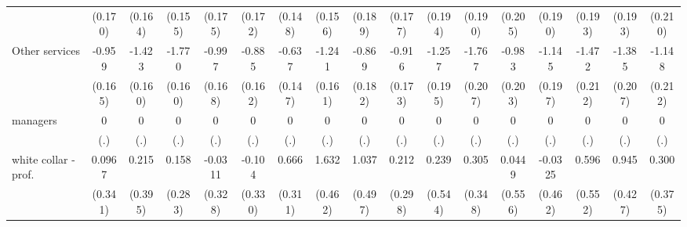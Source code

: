 {\begin{tabular}{l*{16}{c}}
                    &     (0.170)         &     (0.164)         &     (0.155)         &     (0.175)         &     (0.172)         &     (0.148)         &     (0.156)         &     (0.189)         &     (0.177)         &     (0.194)         &     (0.190)         &     (0.205)         &     (0.190)         &     (0.193)         &     (0.193)         &     (0.210)         \\
[1em]
Other services      &      -0.959\sym{***}&      -1.423\sym{***}&      -1.770\sym{***}&      -0.997\sym{***}&      -0.885\sym{***}&      -0.637\sym{***}&      -1.241\sym{***}&      -0.869\sym{***}&      -0.916\sym{***}&      -1.257\sym{***}&      -1.767\sym{***}&      -0.983\sym{***}&      -1.145\sym{***}&      -1.472\sym{***}&      -1.385\sym{***}&      -1.148\sym{***}\\
                    &     (0.165)         &     (0.160)         &     (0.160)         &     (0.168)         &     (0.162)         &     (0.147)         &     (0.161)         &     (0.182)         &     (0.173)         &     (0.195)         &     (0.207)         &     (0.203)         &     (0.197)         &     (0.212)         &     (0.207)         &     (0.212)         \\
[1em]
managers            &           0         &           0         &           0         &           0         &           0         &           0         &           0         &           0         &           0         &           0         &           0         &           0         &           0         &           0         &           0         &           0         \\
                    &         (.)         &         (.)         &         (.)         &         (.)         &         (.)         &         (.)         &         (.)         &         (.)         &         (.)         &         (.)         &         (.)         &         (.)         &         (.)         &         (.)         &         (.)         &         (.)         \\
[1em]
white collar - prof.&      0.0967         &       0.215         &       0.158         &     -0.0311         &      -0.104         &       0.666\sym{*}  &       1.632\sym{***}&       1.037\sym{*}  &       0.212         &       0.239         &       0.305         &      0.0449         &     -0.0325         &       0.596         &       0.945\sym{*}  &       0.300         \\
                    &     (0.341)         &     (0.395)         &     (0.283)         &     (0.328)         &     (0.330)         &     (0.311)         &     (0.462)         &     (0.497)         &     (0.298)         &     (0.544)         &     (0.348)         &     (0.556)         &     (0.462)         &     (0.552)         &     (0.427)         &     (0.375)         \\

\end{tabular}}
